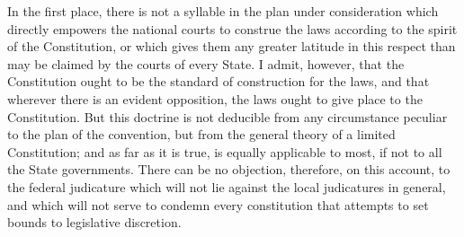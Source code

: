 In the first place, there is not a syllable in the plan under consideration which directly empowers the national courts to construe the laws according to the spirit of the Constitution, or which gives them any greater latitude in this respect than may be claimed by the courts of every State. I admit, however, that the Constitution ought to be the standard of construction for the laws, and that wherever there is an evident opposition, the laws ought to give place to the Constitution. But this doctrine is not deducible from any circumstance peculiar to the plan of the convention, but from the general theory of a limited Constitution; and as far as it is true, is equally applicable to most, if not to all the State governments. There can be no objection, therefore, on this account, to the federal judicature which will not lie against the local judicatures in general, and which will not serve to condemn every constitution that attempts to set bounds to legislative discretion.


